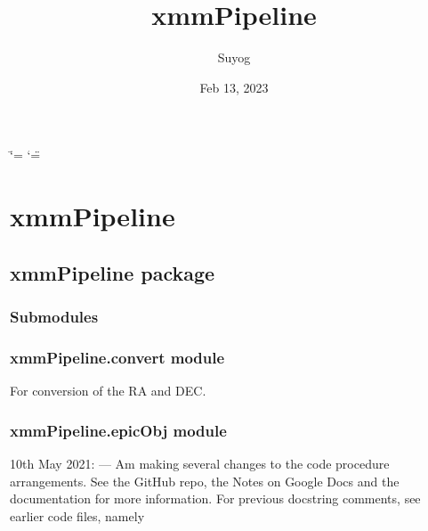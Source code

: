 \documentclass[letterpaper,10pt,english]{sphinxmanual}
\title{xmmPipeline}
\date{Feb 13, 2023}
\author{Suyog}
\begin{document}
\ifdefined\shorthandoff
  \ifnum\catcode`\=\string=\active\shorthandoff{=}\fi
  \ifnum\catcode`\"=\active{}\fi
\fi

\pagestyle{empty}
\sphinxmaketitle
\pagestyle{plain}
\sphinxtableofcontents
\pagestyle{normal}
\label{\detokenize{index::doc}}


\sphinxstepscope


\chapter{xmmPipeline}
\label{\detokenize{modules:xmmpipeline}}\label{\detokenize{modules::doc}}
\sphinxstepscope


\section{xmmPipeline package}
\label{\detokenize{xmmPipeline:xmmpipeline-package}}\label{\detokenize{xmmPipeline::doc}}

\subsection{Submodules}
\label{\detokenize{xmmPipeline:submodules}}

\subsection{xmmPipeline.convert module}
\label{\detokenize{xmmPipeline:module-xmmPipeline.convert}}\label{\detokenize{xmmPipeline:xmmpipeline-convert-module}}
\sphinxAtStartPar
For conversion of the RA and DEC.


\subsection{xmmPipeline.epicObj module}
\label{\detokenize{xmmPipeline:module-xmmPipeline.epicObj}}\label{\detokenize{xmmPipeline:xmmpipeline-epicobj-module}}
\sphinxAtStartPar
10th May 2021:
—
Am making several changes to the code procedure arrangements.
See the GitHub repo, the Notes on Google Docs and the documentation for more information.
For previous docstring comments, see earlier code files, namely 
\end{document}
